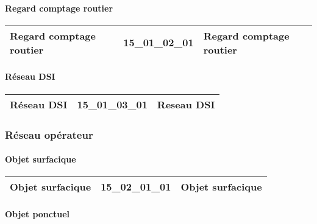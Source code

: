 \documentclass[12pt,titlepage,oneside]{book}
\begin{document}
\paragraph{Regard comptage routier}
\noindent
\vspace{\baselineskip}

\renewcommand{\arraystretch}{1.2}
\begin{supertabular}{|p{10cm}|c|p{15cm}|}
 Regard comptage routier & 15\_01\_02\_01 & Regard comptage routier\\
\hline
\end{supertabular}


\paragraph{Réseau DSI}
\noindent
\vspace{\baselineskip}

\renewcommand{\arraystretch}{1.2}
\begin{supertabular}{|p{10cm}|c|p{15cm}|}
 Réseau DSI & 15\_01\_03\_01 & Reseau DSI\\
\hline
\end{supertabular}

\subsubsection{\large Réseau opérateur}
\paragraph{Objet surfacique}
\noindent
\vspace{\baselineskip}

\renewcommand{\arraystretch}{1.2}
\begin{supertabular}{|p{10cm}|c|p{15cm}|}
 Objet surfacique & 15\_02\_01\_01 & Objet surfacique\\
\hline
\end{supertabular}


\paragraph{Objet ponctuel}
\noindent
\vspace{\baselineskip}
\end{document}
